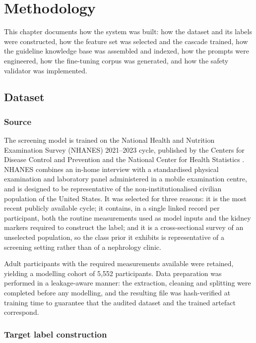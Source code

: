\chapter{Methodology}
\label{ch:methodology}

This chapter documents how the system was built: how the dataset and its labels
were constructed, how the feature set was selected and the cascade trained, how
the guideline knowledge base was assembled and indexed, how the prompts were
engineered, how the fine-tuning corpus was generated, and how the safety
validator was implemented.

\section{Dataset}
\label{sec:dataset}

\subsection{Source}

The screening model is trained on the National Health and Nutrition Examination
Survey (NHANES) 2021--2023 cycle, published by the Centers for Disease Control
and Prevention and the National Center for Health Statistics
\cite{nhanes2021}. NHANES combines an in-home interview with a standardised
physical examination and laboratory panel administered in a mobile examination
centre, and is designed to be representative of the non-institutionalised
civilian population of the United States. It was selected for three reasons:
it is the most recent publicly available cycle; it contains, in a single
linked record per participant, both the routine measurements used as model
inputs and the kidney markers required to construct the label; and it is a
cross-sectional survey of an unselected population, so the class prior it
exhibits is representative of a screening setting rather than of a nephrology
clinic.

Adult participants with the required measurements available were retained,
yielding a modelling cohort of 5{,}552 participants. Data preparation was
performed in a leakage-aware manner: the extraction, cleaning and splitting
were completed before any modelling, and the resulting file was
hash-verified at training time to guarantee that the audited dataset and the
trained artefact correspond.

\subsection{Target label construction}

